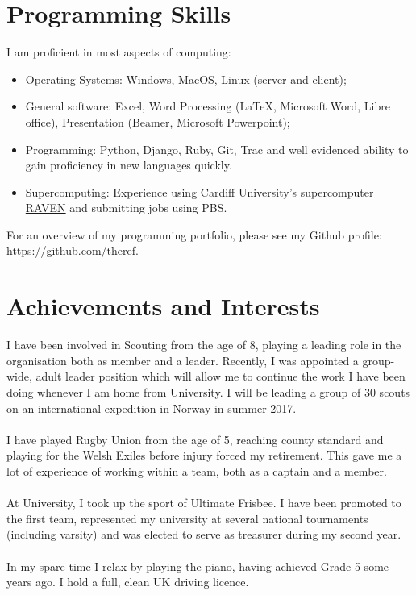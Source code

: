 \documentclass[a4paper]{article}
\begin{document}
\section{Programming Skills}
I am proficient in most aspects of computing:

\begin{itemize}
    \item Operating Systems: Windows, MacOS, Linux (server and client);
    \item General software: Excel, Word Processing (\LaTeX, Microsoft Word, Libre office), Presentation (Beamer, Microsoft Powerpoint);
    \item Programming: Python, Django, Ruby, Git, Trac and well evidenced ability to gain proficiency in new languages quickly.
    \item Supercomputing: Experience using Cardiff University's supercomputer \href{http://www.cardiff.ac.uk/advanced-research-computing}{RAVEN} and submitting jobs using PBS.
\end{itemize}

For an overview of my programming portfolio, please see my Github profile: \url{https://github.com/theref}.

\section{Achievements and Interests}
I have been involved in Scouting from the age of 8, playing a leading role in the organisation both as member and a leader.
Recently, I was appointed a group-wide, adult leader position which will allow me to continue the work I have been doing whenever I am home from University.
I will be leading a group of 30 scouts on an international expedition in Norway in summer 2017.\\
\\
I have played Rugby Union from the age of 5, reaching county standard and playing for the Welsh Exiles before injury forced my retirement.
This gave me a lot of experience of working within a team, both as a captain and a member. \\
\\
At University, I took up the sport of Ultimate Frisbee. I have been promoted to the first team, represented my university at several national tournaments (including varsity) and was elected to serve as treasurer during my second year. \\
\\
In my spare time I relax by playing the piano, having achieved Grade 5 some years ago. I hold a full, clean UK driving licence.
\end{document}
